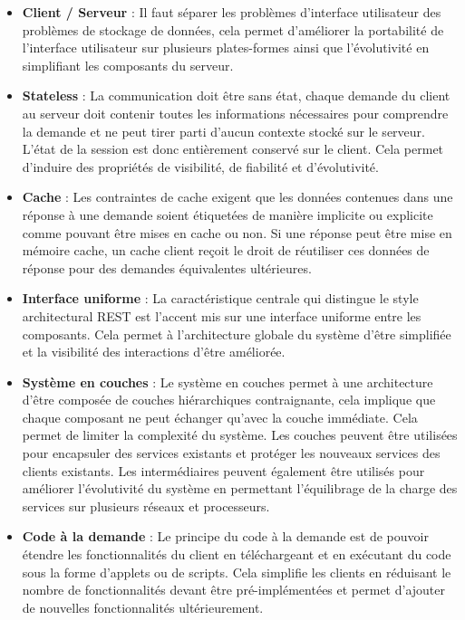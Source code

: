 \begin{itemize}

    \item \textbf{Client / Serveur} :
    \newline
    Il faut séparer les problèmes d’interface utilisateur des problèmes de stockage de données, cela permet d'améliorer la portabilité de l'interface utilisateur sur plusieurs plates-formes ainsi que l’évolutivité en simplifiant les composants du serveur.

    \item \textbf{Stateless} :
    \newline
    La communication doit être sans état, chaque demande du client au serveur doit contenir toutes les informations nécessaires pour comprendre la demande et ne peut tirer parti d'aucun contexte stocké sur le serveur. L'état de la session est donc entièrement conservé sur le client. Cela permet d'induire des propriétés de visibilité, de fiabilité et d'évolutivité.

    \item \textbf{Cache} :
    \newline
    Les contraintes de cache exigent que les données contenues dans une réponse à une demande soient étiquetées de manière implicite ou explicite comme pouvant être mises en cache ou non. Si une réponse peut être mise en mémoire cache, un cache client reçoit le droit de réutiliser ces données de réponse pour des demandes équivalentes ultérieures.

    \item \textbf{Interface uniforme} :
    \newline
    La caractéristique centrale qui distingue le style architectural REST est l'accent mis sur une interface uniforme entre les composants. Cela permet à l'architecture globale du système d'être simplifiée et la visibilité des interactions d'être améliorée.

    \item \textbf{Système en couches} :
    \newline
    Le système en couches permet à une architecture d'être composée de couches hiérarchiques contraignante, cela implique que chaque composant ne peut échanger qu'avec la couche immédiate. Cela permet de limiter la complexité du système. Les couches peuvent être utilisées pour encapsuler des services existants et protéger les nouveaux services des clients existants. Les intermédiaires peuvent également être utilisés pour améliorer l'évolutivité du système en permettant l'équilibrage de la charge des services sur plusieurs réseaux et processeurs.

    \item \textbf{Code à la demande} :
    \newline
    Le principe du code à la demande est de pouvoir étendre les fonctionnalités du client en téléchargeant et en exécutant du code sous la forme d'applets ou de scripts. Cela simplifie les clients en réduisant le nombre de fonctionnalités devant être pré-implémentées et permet d'ajouter de nouvelles fonctionnalités ultérieurement.

\end{itemize}


